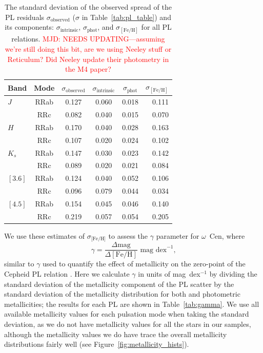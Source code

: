 \documentclass[a4paper,fleqn,usenatbib]{mnras}
\newcommand{\ocen}{$\omega$~Cen\xspace}
\providecommand{\mjdcomment}[1]{{\textcolor{red}{{MJD: #1}}}\xspace}
\begin{document}
\begin{table}
\centering
\caption{The standard deviation of the observed spread of the PL residuals $\sigma_{\text{observed}}$ ($\sigma$ in Table~\ref{tab:pl_table}) and its components: $\sigma_{\text{intrinsic}}$, $\sigma_{\text{phot}}$, and $\sigma_{[\text{Fe/H}]}$ for all PL relations. \mjdcomment{NEEDS UPDATING---assuming we're still doing this bit, are we using Neeley stuff or Reticulum? Did Neeley update their photometry in the M4 paper?}}
\label{tab:metallicity_sigma}
\begin{tabular}{lccccr} 
\hline \hline
Band & Mode & $\sigma_{\text{observed}}$ & $\sigma_{\text{intrinsic}}$ & $\sigma_{\text{phot}}$ & $\sigma_{[\text{Fe/H}]}$ \\
\hline
$J$ & RRab & 0.127 & 0.060 & 0.018 & 0.111 \\
  & RRc & 0.082 & 0.040 & 0.015 & 0.070 \\
$H$ & RRab & 0.170 & 0.040 & 0.028 & 0.163 \\
  & RRc & 0.107 & 0.020 & 0.024 & 0.102 \\
$K_s$ & RRab & 0.147 & 0.030 & 0.023 & 0.142 \\
  & RRc & 0.089 & 0.020 & 0.021 & 0.084 \\
$[3.6]$  & RRab & 0.124 & 0.040 & 0.052 & 0.106 \\
  & RRc & 0.096 & 0.079 & 0.044 & 0.034 \\
$[4.5]$& RRab & 0.154 & 0.045 & 0.046 & 0.140 \\
  & RRc & 0.219 & 0.057 & 0.054 & 0.205 \\
\hline
\end{tabular}
\end{table}

We use these estimates of $\sigma_\text{[Fe/H]}$ to assess the $\gamma$ parameter for \ocen, where 
\begin{equation} \label{eqn:gamma}
\gamma = \dfrac {\Delta \text{mag}} {\Delta [\text{Fe/H}]}\text{ mag dex} ^{-1}\text{,}
\end{equation}
similar to $\gamma$ used to quantify the effect of metallicity on the zero-point of the Cepheid PL relation \citep{1998ApJ...498..181K, 2009MNRAS.396.1287S}. Here we calculate $\gamma$ in units of mag~dex$^{-1}$ by dividing the standard deviation of the metallicity component of the PL scatter by the standard deviation of the metallicity distribution for both \citep{2006ApJ...640L..43S} and photometric \citep{2000AJ....119.1824R} metallicities; the results for each PL are shown in Table~\ref{tab:gamma}. We use all available metallicity values for each pulsation mode when taking the standard deviation, as we do not have metallicity values for all the stars in our samples, although the metallicity values we do have trace the overall metallicity distributions fairly well (see Figure~\ref{fig:metallicity_hists}).
\end{document}
